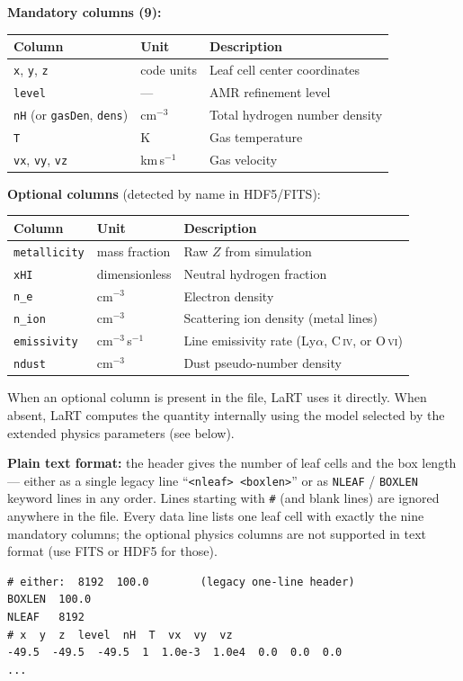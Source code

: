 \documentclass[english,a4paper]{my_memo}
\begin{document}
\textbf{Mandatory columns (9):}
\begin{center}
\begin{tabular}{@{}lll@{}}
\toprule
Column & Unit & Description \\
\midrule
\texttt{x}, \texttt{y}, \texttt{z} & code units & Leaf cell center coordinates \\
\texttt{level}         & ---        & AMR refinement level \\
\texttt{nH} (or \texttt{gasDen}, \texttt{dens}) & cm$^{-3}$  & Total hydrogen number density \\
\texttt{T}             & K          & Gas temperature \\
\texttt{vx}, \texttt{vy}, \texttt{vz} & km\,s$^{-1}$ & Gas velocity \\
\bottomrule
\end{tabular}
\end{center}

\textbf{Optional columns} (detected by name in HDF5/FITS):
\begin{center}
\begin{tabular}{@{}lll@{}}
\toprule
Column & Unit & Description \\
\midrule
\texttt{metallicity} & mass fraction & Raw $Z$ from simulation \\
\texttt{xHI}         & dimensionless & Neutral hydrogen fraction \\
\texttt{n\_e}        & cm$^{-3}$     & Electron density \\
\texttt{n\_ion}      & cm$^{-3}$     & Scattering ion density (metal lines) \\
\texttt{emissivity}  & cm$^{-3}$\,s$^{-1}$ & Line emissivity rate (Ly$\alpha$, C\,\textsc{iv}, or O\,\textsc{vi}) \\
\texttt{ndust}       & cm$^{-3}$     & Dust pseudo-number density \\
\bottomrule
\end{tabular}
\end{center}

When an optional column is present in the file, LaRT uses it directly.
When absent, LaRT computes the quantity internally using the model
selected by the extended physics parameters (see below).

\textbf{Plain text format:} the header gives the number of leaf cells and the
box length --- either as a single legacy line ``\texttt{<nleaf> <boxlen>}'' or
as \texttt{NLEAF} / \texttt{BOXLEN} keyword lines in any order.  Lines starting
with \texttt{\#} (and blank lines) are ignored anywhere in the file.  Every
data line lists one leaf cell with exactly the nine mandatory columns; the
optional physics columns are not supported in text format (use FITS or HDF5
for those).
\begin{lstlisting}[language={}]
# either:  8192  100.0        (legacy one-line header)
BOXLEN  100.0
NLEAF   8192
# x  y  z  level  nH  T  vx  vy  vz
-49.5  -49.5  -49.5  1  1.0e-3  1.0e4  0.0  0.0  0.0
...
\end{lstlisting}
\end{document}
